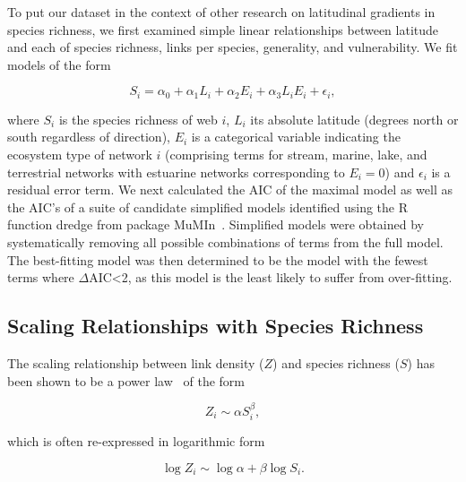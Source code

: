 \documentclass[12pt]{article}
\begin{document}
    To put our dataset in the context of other research on latitudinal gradients in species richness,
    we first examined simple linear relationships between latitude and each of 
    species richness, links per species, generality, and vulnerability. We fit models of the form

    \begin{equation}
    \label{Latfull}
    S_{i} = \alpha_{0} + \alpha_{1} L_{i} + \alpha_{2} E_{i} + \alpha_{3} L_{i} E_{i} + \epsilon_{i} ,
    \end{equation}

    \noindent where $S_{i}$ is the species richness of web $i$, $L_{i}$ its absolute
    latitude (degrees north or south  regardless of direction), $E_{i}$ is a categorical
    variable indicating the ecosystem type of network $i$ (comprising terms for stream, 
    marine, lake, and terrestrial networks with estuarine
    networks corresponding to $E_{i}=0$) and $\epsilon_{i}$ is a residual error term. 
    We next calculated the AIC
    of the maximal model as well as the AIC's of a suite of candidate simplified models identified
    using the R~\cite{R} function dredge from package MuMIn~\cite{MuMIn}. 
    Simplified models were obtained by
    systematically removing all possible combinations of terms from the full model.
    The best-fitting model was then determined to be the model with the fewest terms 
    where $\Delta$AIC\textless2, as this model is the least likely to suffer from over-fitting. 
    


  \subsection*{Scaling Relationships with Species Richness}

    The scaling relationship between link density ($Z$) and species richness ($S$)
    has been shown to be a power law~\cite{Riede2010} of the form 

    \begin{equation}
    \label{Power}
    Z_{i} \sim \alpha S_{i}^{\beta}  ,
    \end{equation}

    \noindent which is often re-expressed in logarithmic form 

    \begin{equation}
    \label{Loglog}
    \log{Z_{i}} \sim \log{\alpha} + \beta\log{S_{i}}  .
    \end{equation}
\end{document}

